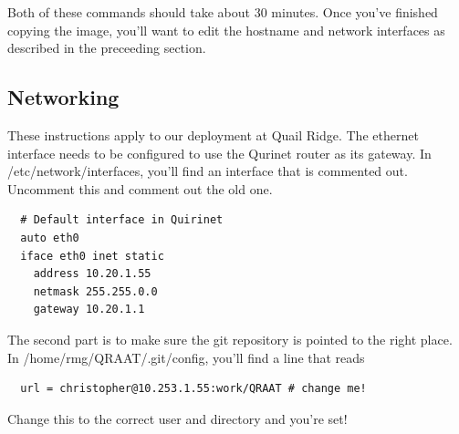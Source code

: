 \documentclass[letter]{article}
\begin{document}
Both of these commands should take about 30 minutes. Once you've finished copying the image, you'll 
want to edit the hostname and network interfaces as described in the preceeding section. 



\subsection{Networking}
These instructions apply to our deployment at Quail Ridge. 
The ethernet interface needs to be configured to use the Qurinet router as its gateway. 
In /etc/network/interfaces, you'll find an interface that is commented out. 
Uncomment this and comment out the old one. 
\begin{verbatim}
  # Default interface in Quirinet
  auto eth0 
  iface eth0 inet static
    address 10.20.1.55
    netmask 255.255.0.0
    gateway 10.20.1.1
\end{verbatim}

The second part is to make sure the git repository is pointed to the right place. In 
/home/rmg/QRAAT/.git/config, you'll find a line that reads
\begin{verbatim}
  url = christopher@10.253.1.55:work/QRAAT # change me!
\end{verbatim}
Change this to the correct user and directory and you're set!
\end{document}
